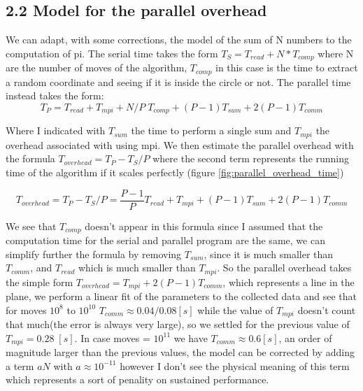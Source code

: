 \documentclass[a4paper]{article}
\begin{document}
\subsection*{2.2 Model for the parallel overhead}
We can adapt, with some corrections, the model of the sum of N numbers to the computation of pi. The serial time takes the form $T_S = T_{read} + N*T_{comp}$ where N are the number of moves of the algorithm, $T_{comp}$ in this case is the time to extract a random coordinate and seeing if it is inside the circle or not. The parallel time instead takes the form:
\begin{equation*}
    T_P = T_{read} + T_{mpi} + N/P \;T_{comp} + (P-1)T_{sum} + 2(P-1)T_{comm}
\end{equation*}

Where I indicated with $T_{sum}$ the time to perform a single sum and $T_{mpi}$ the overhead associated with using mpi. We then estimate the parallel overhead with the formula $T_{overhead} = T_P - T_S / P$ where the second term represents the running time of the algorithm if it scales perfectly (figure \ref{fig:parallel_overhead_time})

\begin{equation*}
    T_{overhead} = T_P - T_S / P = \frac{P-1}{P} T_{read} + T_{mpi} + (P-1)T_{sum} + 2(P-1)T_{comm}
\end{equation*}

We see that $T_{comp}$ doesn't appear in this formula since I assumed that the computation time for the serial and parallel program are the same, we can simplify further the formula by removing $T_{sum}$, since it is much smaller than $T_{comm}$, and $T_{read}$ which is much smaller than $T_{mpi}$. So the parallel overhead takes the simple form $T_{overhead} = T_{mpi} + 2(P-1)T_{comm}$, which represents a line in the plane, we perform a linear fit of the parameters to the collected data and see that for moves $10^8$ to $10^{10}$ $T_{comm}\approx 0.04/0.08 [s]$ while the value of $T_{mpi}$ doesn't count that much(the error is always very large), so we settled for the previous value of $T_{mpi}=0.28 \; [s]$. In case moves = $10^{11}$ we have $T_{comm}\approx 0.6 [s]$, an order of magnitude larger than the previous values, the model can be corrected by adding a term $aN$ with $a\approx 10^{-11}$ however I don't see the physical meaning of this term which represents a sort of penality on sustained performance.
\end{document}
